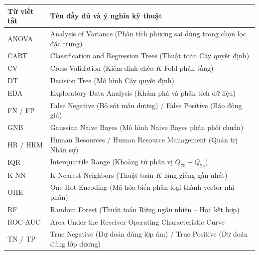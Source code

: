 
\begin{table}[H]
\noindent
\begin{tabularx}{\textwidth}{|L{3.5cm}|Y|}
\hline
\textbf{Từ viết tắt} & \textbf{Tên đầy đủ và ý nghĩa kỹ thuật} \\
\hline
ANOVA & Analysis of Variance (Phân tích phương sai dùng trong chọn lọc đặc trưng) \\
\hline
CART & Classification and Regression Trees (Thuật toán Cây quyết định) \\
\hline
CV & Cross-Validation (Kiểm định chéo $K$-Fold phân tầng) \\
\hline
DT & Decision Tree (Mô hình Cây quyết định) \\
\hline
EDA & Exploratory Data Analysis (Khám phá và phân tích dữ liệu) \\
\hline
FN / FP & False Negative (Bỏ sót mẫu dương) / False Positive (Báo động giả) \\
\hline
GNB & Gaussian Naive Bayes (Mô hình Naive Bayes phân phối chuẩn) \\
\hline
HR / HRM & Human Resources / Human Resource Management (Quản trị Nhân sự) \\
\hline
IQR & Interquartile Range (Khoảng tứ phân vị $Q_{75} - Q_{25}$) \\
\hline
K-NN & K-Nearest Neighbors (Thuật toán $K$ láng giềng gần nhất) \\
\hline
OHE & One-Hot Encoding (Mã hóa biến phân loại thành vector nhị phân) \\
\hline
RF & Random Forest (Thuật toán Rừng ngẫu nhiên -- Học kết hợp) \\
\hline
ROC-AUC & Area Under the Receiver Operating Characteristic Curve \\
\hline
TN / TP & True Negative (Dự đoán đúng lớp âm) / True Positive (Dự đoán đúng lớp dương) \\
\hline
\end{tabularx}
\end{table}
